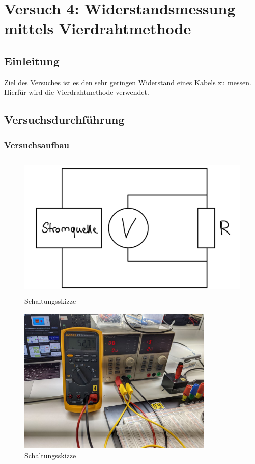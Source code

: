 \chapter{Versuch 4: Widerstandsmessung mittels Vierdrahtmethode}
\section{Einleitung}
Ziel des Versuches ist es den sehr geringen Widerstand eines Kabels zu messen.
Hierfür wird die Vierdrahtmethode verwendet. 

\section{Versuchsdurchführung}

\subsection{Versuchsaufbau}

\begin{figure}[H]
	\centering
	\includegraphics[height=7cm]{images/Versuch4/Schaltskizze.jpeg}
	\caption{Schaltungsskizze}
	\label{fig: Schaltungsskizze}
\end{figure}

\begin{figure}[H]
	\centering
	\includegraphics[height=7cm]{images/Versuch4/Versuchsaufbau.jpeg}
	\caption{Schaltungsskizze}
	\label{fig: Schaltungsskizze}
\end{figure}


